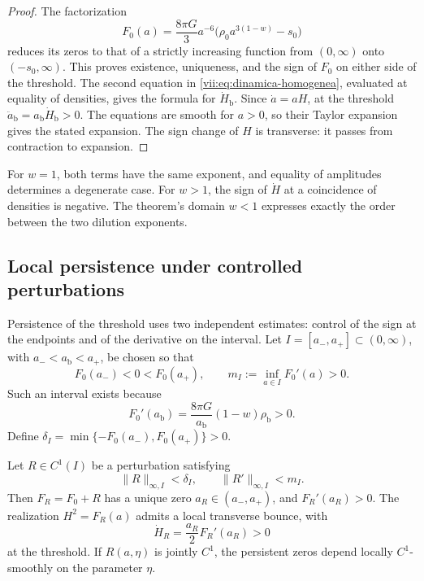 \begin{proof}
The factorization
\[
 F_0(a)=\frac{8\pi G}{3}a^{-6}
             \bigl(\rho_0a^{3(1-w)}-s_0\bigr)
\]
reduces its zeros to that of a strictly increasing function from
\((0,\infty)\) onto \((-s_0,\infty)\). This proves existence,
uniqueness, and the sign of \(F_0\) on either side of the threshold.
The second equation in \eqref{vii:eq:dinamica-homogenea}, evaluated
at equality of densities, gives the formula for \(\dot H_{\mathrm b}\).
Since \(\dot a=aH\), at the threshold
\(\ddot a_{\mathrm b}=a_{\mathrm b}\dot H_{\mathrm b}>0\).
The equations are smooth for \(a>0\), so their Taylor
expansion gives the stated expansion. The sign change of \(H\) is
transverse: it passes from contraction to expansion.
\end{proof}

For \(w=1\), both terms have the same exponent, and equality of
amplitudes determines a degenerate case. For \(w>1\), the sign of
\(\dot H\) at a coincidence of densities is negative.
The theorem's domain \(w<1\) expresses exactly the order between
the two dilution exponents.

\subsection{Local persistence under controlled perturbations}
\label{vii:sec:persistencia}

Persistence of the threshold uses two independent estimates:
control of the sign at the endpoints and of the derivative on the
interval. Let \(I=[a_-,a_+]\subset(0,\infty)\), with
\(a_-<a_{\mathrm b}<a_+\), be chosen so that
\[
 F_0(a_-)<0<F_0(a_+),\qquad
 m_I:=\inf_{a\in I}F_0'(a)>0.
\]
Such an interval exists because
\[
 F_0'(a_{\mathrm b})
   =\frac{8\pi G}{a_{\mathrm b}}(1-w)\rho_{\mathrm b}>0.
\]
Define
\(\delta_I=\min\{-F_0(a_-),F_0(a_+)\}>0\).

\begingroup\fontsize{10}{11.7}\selectfont
\setlength{\parskip}{2pt}\setlength{\abovedisplayskip}{5pt}\setlength{\belowdisplayskip}{5pt}
\begin{theorem}
\label{vii:thm:persistencia}
Let \(R\in C^1(I)\) be a perturbation satisfying
\[
 \|R\|_{\infty,I}<\delta_I,\qquad
 \|R'\|_{\infty,I}<m_I.
\]
Then \(F_R=F_0+R\) has a unique zero \(a_R\in(a_-,a_+)\), and
\(F_R'(a_R)>0\). The realization \(H^2=F_R(a)\) admits a local
transverse bounce, with
\[
 \dot H_R=\frac{a_R}{2}F_R'(a_R)>0
\]
at the threshold. If \(R(a,\eta)\) is jointly \(C^1\), the persistent
zeros depend locally \(C^1\)-smoothly on the parameter \(\eta\).
\end{theorem}

